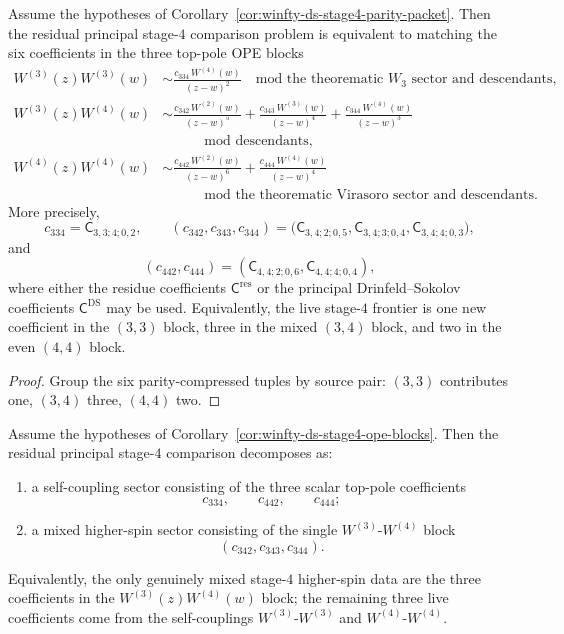 \begin{corollary}
\label{cor:winfty-ds-stage4-ope-blocks}
Assume the hypotheses of
Corollary~\ref{cor:winfty-ds-stage4-parity-packet}.  Then the residual
principal stage-$4$ comparison problem is equivalent to matching the
six coefficients in the three top-pole OPE blocks
\begin{align*}
W^{(3)}(z)W^{(3)}(w)
&\sim
\frac{c_{334}\,W^{(4)}(w)}{(z-w)^2}
\quad\text{mod the theorematic $W_3$ sector and descendants},\\
W^{(3)}(z)W^{(4)}(w)
&\sim
\frac{c_{342}\,W^{(2)}(w)}{(z-w)^5}
+\frac{c_{343}\,W^{(3)}(w)}{(z-w)^4}
+\frac{c_{344}\,W^{(4)}(w)}{(z-w)^3}\\
&\qquad
\quad\text{mod descendants},\\
W^{(4)}(z)W^{(4)}(w)
&\sim
\frac{c_{442}\,W^{(2)}(w)}{(z-w)^6}
+\frac{c_{444}\,W^{(4)}(w)}{(z-w)^4}\\
&\qquad
\quad\text{mod the theorematic Virasoro sector and descendants}.
\end{align*}
More precisely,
\[
c_{334}=\mathsf{C}_{3,3;4;0,2},
\qquad
(c_{342},c_{343},c_{344})
\!=\!
\bigl(
\mathsf{C}_{3,4;2;0,5},
\mathsf{C}_{3,4;3;0,4},
\mathsf{C}_{3,4;4;0,3}
\bigr),
\]
and
\[
(c_{442},c_{444})
=(\mathsf{C}_{4,4;2;0,6},\mathsf{C}_{4,4;4;0,4}),
\]
where either the residue coefficients
$\mathsf{C}^{\mathrm{res}}$ or the principal Drinfeld--Sokolov
coefficients $\mathsf{C}^{\mathrm{DS}}$ may be used.  Equivalently, the
live stage-$4$ frontier is one new coefficient in the $(3,3)$ block,
three in the mixed $(3,4)$ block, and two in the even $(4,4)$ block.
\end{corollary}

\begin{proof}
Group the six parity-compressed tuples by source pair: $(3,3)$ contributes one, $(3,4)$ three, $(4,4)$ two.
\end{proof}

\begin{corollary}
\label{cor:winfty-ds-stage4-mixed-self-split}
Assume the hypotheses of
Corollary~\ref{cor:winfty-ds-stage4-ope-blocks}.  Then the residual
principal stage-$4$ comparison decomposes as:
\begin{enumerate}[label=\textup{(\roman*)}]
\item a self-coupling sector consisting of the three scalar top-pole
  coefficients
  \[
  c_{334},\qquad c_{442},\qquad c_{444};
  \]
\item a mixed higher-spin sector consisting of the single
  $W^{(3)}$-$W^{(4)}$ block
  \[
  (c_{342},c_{343},c_{344}).
  \]
\end{enumerate}
Equivalently, the only genuinely mixed stage-$4$ higher-spin data are
the three coefficients in the $W^{(3)}(z)W^{(4)}(w)$ block; the
remaining three live coefficients come from the self-couplings
$W^{(3)}$-$W^{(3)}$ and $W^{(4)}$-$W^{(4)}$.
\end{corollary}

